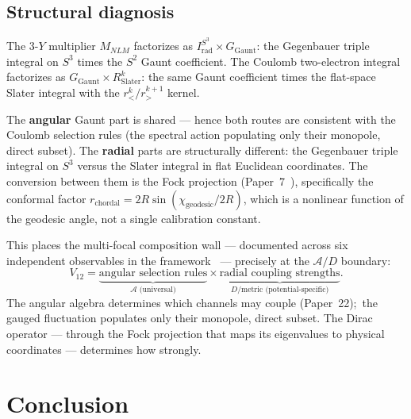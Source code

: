 \documentclass[twocolumn,pra,amsmath,amssymb,superscriptaddress]{revtex4-2}
\begin{document}
\subsection{Structural diagnosis}

The 3-$Y$ multiplier $M_{NLM}$ factorizes as
$I_{\mathrm{rad}}^{S^3} \times G_{\mathrm{Gaunt}}$: the Gegenbauer
triple integral on $S^3$ times the $S^2$ Gaunt coefficient.  The
Coulomb two-electron integral factorizes as
$G_{\mathrm{Gaunt}} \times R^k_{\mathrm{Slater}}$: the same Gaunt
coefficient times the flat-space Slater integral with the
$r_<^k / r_>^{k+1}$ kernel.

The \textbf{angular} Gaunt part is shared --- hence both routes are
consistent with the Coulomb selection rules (the spectral action
populating only their monopole, direct subset).  The \textbf{radial} parts are structurally
different: the Gegenbauer triple integral on $S^3$ versus the Slater
integral in flat Euclidean coordinates.  The conversion between them
is the Fock projection (Paper~7~\cite{paper7}), specifically the
conformal factor
$r_{\mathrm{chordal}} = 2R \sin(\chi_{\mathrm{geodesic}} / 2R)$,
which is a nonlinear function of the geodesic angle, not a single
calibration constant.

This places the multi-focal composition wall --- documented across
six independent observables in the framework~\cite{paper34} ---
precisely at the $\mathcal{A}/D$ boundary:
\begin{equation}
  V_{12} = \underbrace{\text{angular selection rules}}_{\mathcal{A}
    \text{ (universal)}} \times
  \underbrace{\text{radial coupling strengths}}_{D / \text{metric
    (potential-specific)}}.
  \label{eq:two_body_AD}
\end{equation}
The angular algebra determines which channels may couple (Paper~22);\
the gauged fluctuation populates only their monopole, direct subset.
The Dirac operator
--- through the Fock projection that maps its eigenvalues to
physical coordinates --- determines how strongly.

\section{Conclusion}
\label{sec:conclusion}
\end{document}
